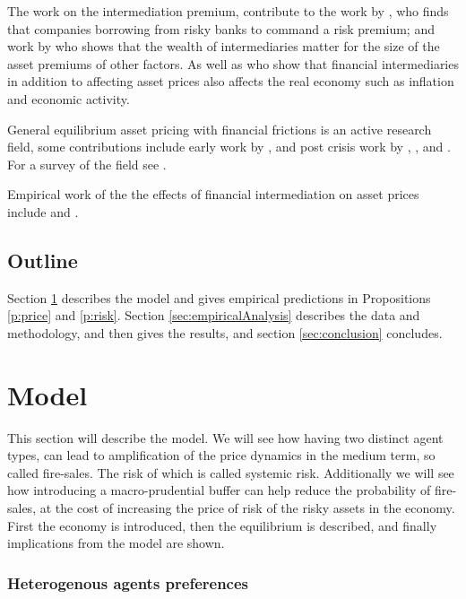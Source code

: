 \documentclass[11pt]{article}
\begin{document}
The work on the intermediation premium, contribute to the work by \citet{Marchuk2017}, who finds that companies borrowing from risky banks to command a risk premium; and work by \citet{Adrian2014} who shows that the wealth of intermediaries matter for the size of the asset premiums of other factors. As well as \citet{Adrian2010} who show that financial intermediaries in addition to affecting asset prices also affects the real economy such as inflation and economic activity.

General equilibrium asset pricing with financial frictions is an active research field, some contributions include early work by \citet{Geanakoplos1997, geanakoplos2003}, and post crisis work by \citet{Brunnermeier2009}, \citet{He2013}, and \citet{Brunnermeier2014}. For a survey of the field see \citet{Brunnermeier2013}.

Empirical work of the the effects of financial intermediation on asset prices include \citet{Adrian2010,Adrian2014} and \citet{Marchuk2017}.

\subsection*{Outline}

Section \ref{sec:model} describes the model and gives empirical predictions in Propositions \ref{p:price} and \ref{p:risk}. Section \ref{sec:empiricalAnalysis} describes the data and methodology, and then gives %
the results, and section \ref{sec:conclusion} concludes.




\section{Model} \label{sec:model}

This section will describe the model. We will see how having two distinct agent types, can lead to amplification of the price dynamics in the medium term, so called fire-sales. The risk of which is called systemic risk. Additionally we will see how introducing a macro-prudential buffer can help reduce the probability of fire-sales, at the cost of increasing the price of risk of the risky assets in the economy. First the economy is introduced, then the equilibrium is described, and finally implications from the model are shown. 

\subsubsection*{Heterogenous agents preferences}
\end{document}
